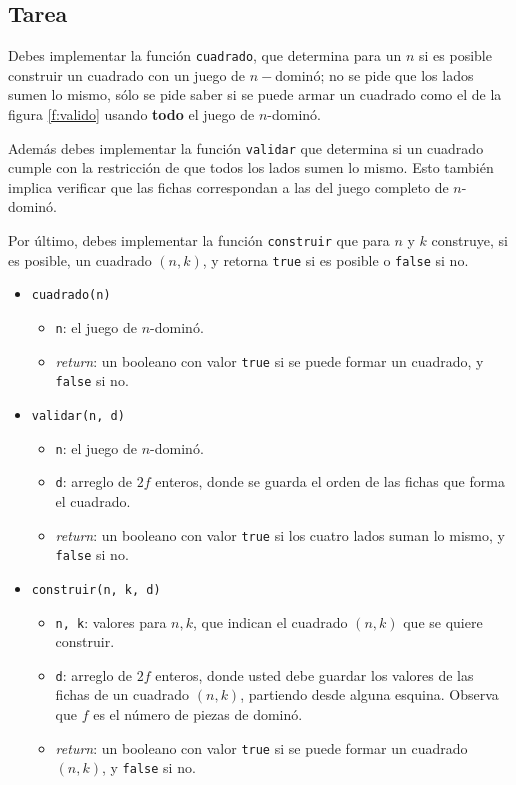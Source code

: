 \documentclass{oci}
\begin{document}
\subsection*{Tarea}

Debes implementar la función \verb+cuadrado+, que determina para un $n$ si es posible construir un cuadrado con un juego de $n-$dominó; no se pide que los lados sumen lo mismo, sólo se pide saber si se puede armar un cuadrado como el de la figura \ref{f:valido} usando \textbf{todo} el juego de $n$-dominó.

Además debes implementar la función \verb+validar+ que determina si un cuadrado cumple con la restricción de que todos los lados sumen lo mismo.
Esto también implica verificar que las fichas correspondan a las del juego completo de $n$-dominó.

Por último, debes implementar la función \verb+construir+ que para $n$ y $k$ construye, si es posible, un cuadrado $(n,k)$, y retorna \verb+true+ si es posible o \verb+false+ si no.

\begin{itemize}
 \item \verb+cuadrado(n)+
 \begin{itemize}
  \item \verb+n+: el juego de $n$-dominó.
  \item \emph{return}: un booleano con valor \verb+true+ si se puede formar un cuadrado, y \verb+false+ si no.
 \end{itemize}
 \item \verb+validar(n, d)+
 \begin{itemize}
  \item \verb+n+: el juego de $n$-dominó.
  \item \verb+d+: arreglo de $2f$ enteros, donde se guarda el orden de las fichas que forma el cuadrado.
  \item \emph{return}: un booleano con valor \verb+true+ si los cuatro lados suman lo mismo, y \verb+false+ si no.
 \end{itemize}

 \item \verb+construir(n, k, d)+
 \begin{itemize}
  \item \verb+n, k+: valores para $n,k$, que indican el cuadrado $(n,k)$ que se quiere construir.
  \item \verb+d+: arreglo de $2f$ enteros, donde usted debe guardar los valores de las fichas de un cuadrado $(n,k)$, partiendo desde alguna esquina. Observa que $f$ es el número de piezas de dominó.
  \item \emph{return}: un booleano con valor \verb+true+ si se puede formar un cuadrado $(n,k)$, y \verb+false+ si no.
 \end{itemize}
\end{itemize}
\end{document}
